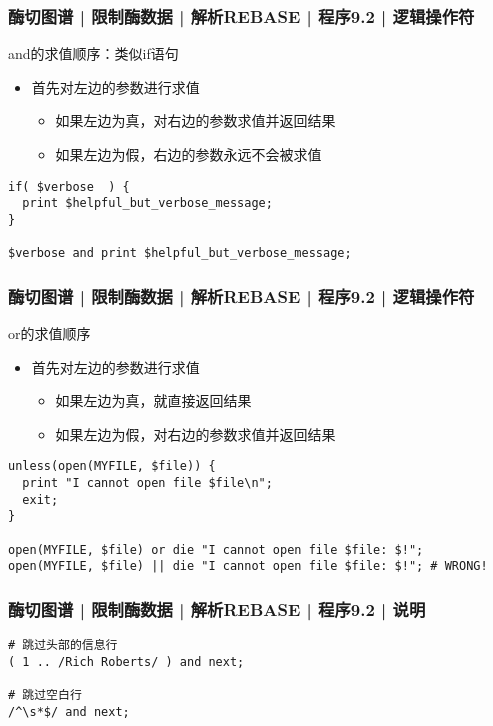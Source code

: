 \begin{frame}[fragile]
  \frametitle{酶切图谱 | 限制酶数据 | 解析REBASE | 程序9.2 | \alert{逻辑操作符}}
  \begin{block}{and的求值顺序：类似if语句}
    \begin{itemize}
      \item 首先对左边的参数进行求值
	\begin{itemize}
	  \item 如果左边为真，对右边的参数求值并返回结果
	  \item 如果左边为假，右边的参数永远不会被求值
	\end{itemize}
    \end{itemize}
  \end{block}
  \pause
\begin{lstlisting}
if( $verbose  ) {
  print $helpful_but_verbose_message;
}

$verbose and print $helpful_but_verbose_message;
\end{lstlisting}
\end{frame}

\begin{frame}[fragile]
  \frametitle{酶切图谱 | 限制酶数据 | 解析REBASE | 程序9.2 | \alert{逻辑操作符}}
  \begin{block}{or的求值顺序}
    \begin{itemize}
      \item 首先对左边的参数进行求值
	\begin{itemize}
	  \item 如果左边为真，就直接返回结果
	  \item 如果左边为假，对右边的参数求值并返回结果
	\end{itemize}
    \end{itemize}
  \end{block}
  \pause
  \vspace{-0.5em}
\begin{lstlisting}
unless(open(MYFILE, $file)) {
  print "I cannot open file $file\n";
  exit;
}

open(MYFILE, $file) or die "I cannot open file $file: $!";
open(MYFILE, $file) || die "I cannot open file $file: $!"; # WRONG!
\end{lstlisting}
\end{frame}

\begin{frame}[fragile]
  \frametitle{酶切图谱 | 限制酶数据 | 解析REBASE | 程序9.2 | 说明}
\begin{lstlisting}
# 跳过头部的信息行
( 1 .. /Rich Roberts/ ) and next;

# 跳过空白行
/^\s*$/ and next;
\end{lstlisting}
\end{frame}

